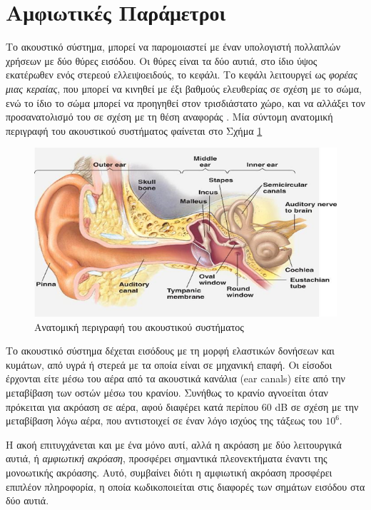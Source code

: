 \section{Αμφιωτικές Παράμετροι} \label{sec:binaural_cues}


Το ακουστικό σύστημα, μπορεί να παρομοιαστεί με έναν υπολογιστή πολλαπλών χρήσεων με δύο θύρες εισόδου. Οι θύρες είναι τα δύο αυτιά, στο ίδιο ύψος εκατέρωθεν ενός στερεού ελλειψοειδούς, το κεφάλι.  Το κεφάλι λειτουργεί ως \textit{φορέας μιας κεραίας}, που μπορεί να κινηθεί με έξι βαθμούς ελευθερίας σε σχέση με το σώμα, ενώ το ίδιο το σώμα μπορεί να προηγηθεί στον τρισδιάστατο χώρο, και να αλλάξει τον προσανατολισμό του σε σχέση με τη θέση αναφοράς \cite{Kohlrausch2013}. Μία σύντομη ανατομική περιγραφή του ακουστικού συστήματος φαίνεται στο Σχήμα \ref{fig:auditory_system}

\begin{figure}[h]
  \centering
  \includegraphics[width=\textwidth]{images/auditory_system.png}
  \caption{Ανατομική περιγραφή του ακουστικού συστήματος}
  \label{fig:auditory_system}
\end{figure}

Το ακουστικό σύστημα δέχεται εισόδους με τη μορφή ελαστικών δονήσεων και κυμάτων, από υγρά ή στερεά με τα οποία είναι σε μηχανική επαφή. Οι είσοδοι έρχονται είτε μέσω του αέρα από τα ακουστικά κανάλια (ear canals) είτε από την μεταβίβαση των οστών μέσω του κρανίου. Συνήθως το κρανίο αγνοείται όταν πρόκειται για ακρόαση σε αέρα, αφού διαφέρει κατά περίπου 60 dB σε σχέση με την μεταβίβαση λόγω αέρα, που αντιστοιχεί σε έναν λόγο ισχύος της τάξεως του $10^6$.

Η ακοή επιτυγχάνεται και με ένα μόνο αυτί, αλλά η ακρόαση με δύο λειτουργικά αυτιά, ή \textit{αμφιωτική ακρόαση}, προσφέρει σημαντικά πλεονεκτήματα έναντι της μονοωτικής ακρόασης. Αυτό, συμβαίνει διότι η αμφιωτική ακρόαση προσφέρει επιπλέον πληροφορία, η οποία κωδικοποιείται στις διαφορές των σημάτων εισόδου στα δύο αυτιά.

